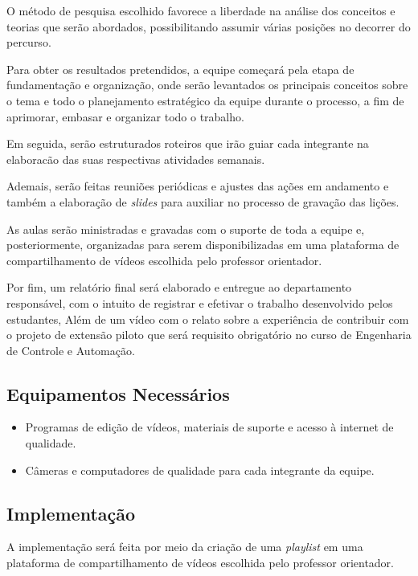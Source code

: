 \documentclass[a4paper,10pt]{article} %
\begin{document}
O método de pesquisa escolhido favorece a liberdade na análise dos conceitos e teorias que serão abordados, possibilitando assumir várias posições no decorrer do percurso.

Para obter os resultados pretendidos, a equipe começará pela etapa de fundamentação e organização, onde serão levantados os principais conceitos sobre o tema e todo o planejamento estratégico da equipe durante o processo, a fim de aprimorar, embasar e organizar todo o trabalho.

Em seguida, serão estruturados roteiros que irão guiar cada integrante na elaboracão das suas respectivas atividades semanais.

Ademais, serão feitas reuniões periódicas e ajustes das ações em andamento e também a elaboração de \textit{slides} para auxiliar no processo de gravação das lições.

As aulas serão ministradas e gravadas com o suporte de toda a equipe e, posteriormente, organizadas para serem disponibilizadas em uma plataforma de compartilhamento de vídeos escolhida  pelo  professor orientador.

Por fim, um relatório final será elaborado e entregue ao departamento responsável, com o intuito de registrar e efetivar o trabalho desenvolvido pelos estudantes, Além de um vídeo com o relato sobre a experiência de contribuir com  o projeto de extensão piloto que será requisito obrigatório no curso de Engenharia de Controle e Automação.
 
\subsection{Equipamentos Necessários}

\begin{itemize}
 \item Programas de edição de vídeos, materiais de suporte e acesso à internet de qualidade. 
 \item Câmeras e computadores de qualidade para cada integrante da equipe.
 \end{itemize}

\subsection{Implementação}
A implementação será feita por meio da criação de uma \textit{playlist} em uma plataforma de compartilhamento de vídeos escolhida pelo professor orientador.
\end{document}

